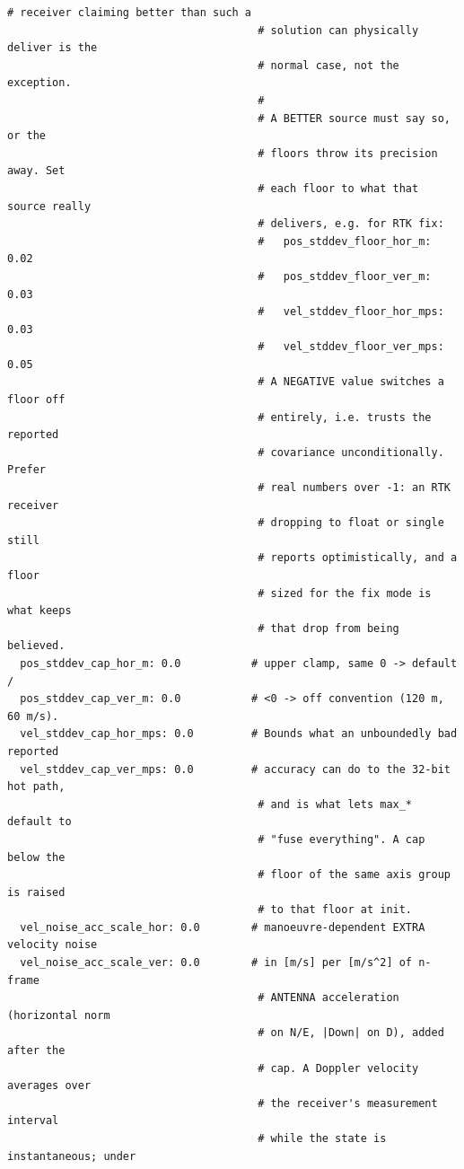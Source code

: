 \documentclass[11pt,a4paper]{article}
\begin{document}
\begin{lstlisting}[style=cfg]
                                       # receiver claiming better than such a
                                       # solution can physically deliver is the
                                       # normal case, not the exception.
                                       #
                                       # A BETTER source must say so, or the
                                       # floors throw its precision away. Set
                                       # each floor to what that source really
                                       # delivers, e.g. for RTK fix:
                                       #   pos_stddev_floor_hor_m: 0.02
                                       #   pos_stddev_floor_ver_m: 0.03
                                       #   vel_stddev_floor_hor_mps: 0.03
                                       #   vel_stddev_floor_ver_mps: 0.05
                                       # A NEGATIVE value switches a floor off
                                       # entirely, i.e. trusts the reported
                                       # covariance unconditionally. Prefer
                                       # real numbers over -1: an RTK receiver
                                       # dropping to float or single still
                                       # reports optimistically, and a floor
                                       # sized for the fix mode is what keeps
                                       # that drop from being believed.
  pos_stddev_cap_hor_m: 0.0           # upper clamp, same 0 -> default /
  pos_stddev_cap_ver_m: 0.0           # <0 -> off convention (120 m, 60 m/s).
  vel_stddev_cap_hor_mps: 0.0         # Bounds what an unboundedly bad reported
  vel_stddev_cap_ver_mps: 0.0         # accuracy can do to the 32-bit hot path,
                                       # and is what lets max_* default to
                                       # "fuse everything". A cap below the
                                       # floor of the same axis group is raised
                                       # to that floor at init.
  vel_noise_acc_scale_hor: 0.0        # manoeuvre-dependent EXTRA velocity noise
  vel_noise_acc_scale_ver: 0.0        # in [m/s] per [m/s^2] of n-frame
                                       # ANTENNA acceleration (horizontal norm
                                       # on N/E, |Down| on D), added after the
                                       # cap. A Doppler velocity averages over
                                       # the receiver's measurement interval
                                       # while the state is instantaneous; under

\end{lstlisting}
\end{document}
